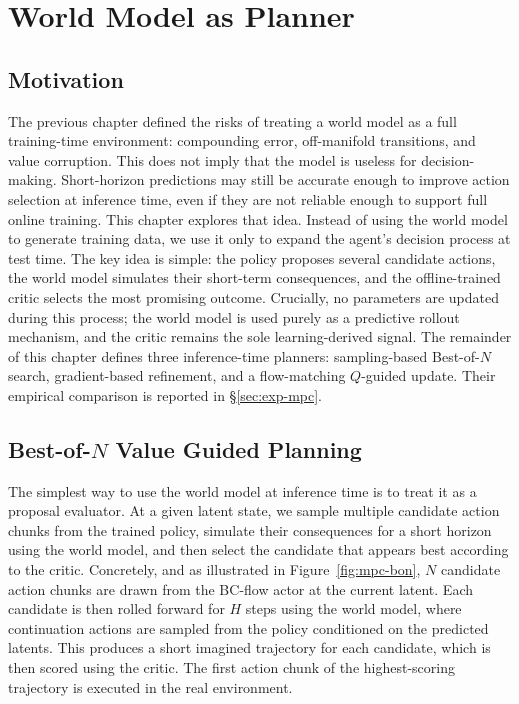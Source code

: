 \chapter{World Model as Planner}
\label{chap:wm-planner}

\section{Motivation}

The previous chapter defined the risks of treating a world model as a full training-time environment: compounding error, off-manifold transitions, and value corruption. This does not imply that the model is useless for decision-making. Short-horizon predictions may still be accurate enough to improve action selection at inference time, even if they are not reliable enough to support full online training.
This chapter explores that idea. Instead of using the world model to generate training data, we use it only to expand the agent's decision process at test time. The key idea is simple: the policy proposes several candidate actions, the world model simulates their short-term consequences, and the offline-trained critic selects the most promising outcome. Crucially, no parameters are updated during this process; the world model is used purely as a predictive rollout mechanism, and the critic remains the sole learning-derived signal.
The remainder of this chapter defines three inference-time planners:
sampling-based Best-of-$N$ search, gradient-based refinement, and a
flow-matching $Q$-guided update. Their empirical comparison is reported
in \S\ref{sec:exp-mpc}.

\section{Best-of-$N$ Value Guided Planning}
\label{sec:mpc-bon}

The simplest way to use the world model at inference time is to treat it as a proposal evaluator. At a given latent state, we sample multiple candidate action chunks from the trained policy, simulate their consequences for a short horizon using the world model, and then select the candidate that appears best according to the critic.
Concretely, and as illustrated in Figure~\ref{fig:mpc-bon}, $N$ candidate action chunks are drawn from the BC-flow actor at the current latent. Each candidate is then rolled forward for $H$ steps using the world model, where continuation actions are sampled from the policy conditioned on the predicted latents. This produces a short imagined trajectory for each candidate, which is then scored using the critic. The first action chunk of the highest-scoring trajectory is executed in the real environment.

